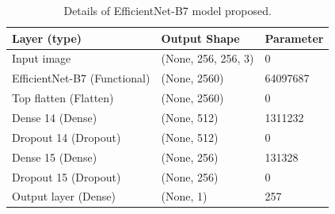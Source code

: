 \documentclass[12pt]{diazessay}
\newcommand{\RomanNumeralCaps}[1]
{\MakeUppercase{\romannumeral #1}}
\begin{document}
    \begin{table}[H]
        \begin{center}
        \begin{tabular}{lll}
            \hline
            \textbf{ Layer (type)} & \textbf{Output Shape} & \textbf{Parameter} \\
            \hline
            Input image & (None, 256, 256, 3) & 0 \\
            EfficientNet-B7 (Functional) & (None, 2560)   & 64097687 \\
            Top flatten (Flatten) & (None, 2560) & 0 \\
            Dense 14 (Dense) & (None, 512) & 1311232 \\
            Dropout 14 (Dropout) & (None, 512) & 0 \\
            Dense 15 (Dense) & (None, 256) & 131328\\
            Dropout 15 (Dropout) & (None, 256) & 0\\
            Output layer (Dense)  & (None, 1)  & 257\\
            \hline
        \end{tabular}
        \end{center}
        \caption[Details of EfficientNetb7 Model Proposed]{\centering Details of EfficientNet-B7 model proposed.}
    \end{table}
    
   
    
    

   
    
\end{document}

